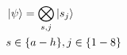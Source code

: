 \documentclass[preview, border={5pt,5pt,5pt,5pt}]{standalone}
\begin{document}
$
\begin{aligned}
    &\ket{\psi} = \bigotimes_{s,j} \ket{s_j} \\
    &s\in\{a-h\} , j\in\{1-8\}
\end{aligned}
$
\end{document}
